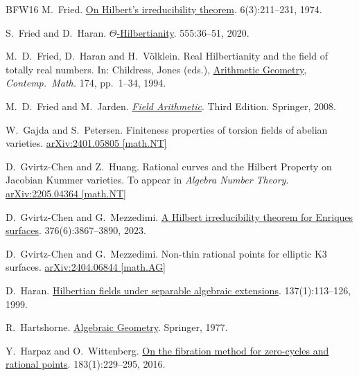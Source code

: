 \documentclass[10pt,a4paper]{amsart}
\theoremstyle{plain}
\theoremstyle{remark}
\numberwithin{theorem}{section}
\begin{document}
\begin{thebibliography}{BFW16}
M.~Fried.
\newblock \href{https://doi.org/10.1016/0022-314X(74)90015-8}{On Hilbert's irreducibility theorem}.
 6(3):211--231, 1974.

S.~Fried and D.~Haran.
\newblock \href{https://doi.org/10.1016/j.jalgebra.2020.03.007}{$\Theta$-Hilbertianity}.
 555:36--51, 2020.

M.~D.~Fried, D.~Haran and H.~Völklein. 
\newblock Real Hilbertianity and the field of totally real numbers.
\newblock In: Childress, Jones (eds.), \href{https://doi.org/10.1090/conm/174}{Arithmetic Geometry}, {{\em Contemp.\ Math.} 174}, pp.~1--34, 1994.

M.~D.~Fried and M.~Jarden.
\newblock \href{https://doi.org/10.1007/978-3-540-77270-5}{\em Field Arithmetic}.
\newblock Third Edition. Springer, 2008.

W.~Gajda and S.~Petersen.
\newblock Finiteness properties of torsion fields of abelian varieties.
\newblock \href{https://arxiv.org/abs/2401.05805}{arXiv:2401.05805 [math.NT]}

D.~Gvirtz-Chen and Z.~Huang.
\newblock Rational curves and the Hilbert Property on Jacobian Kummer varieties.
\newblock To appear in {\em Algebra Number Theory}.
\newblock \href{https://doi.org/10.48550/arXiv.2205.04364}{arXiv:2205.04364 [math.NT]}

D.~Gvirtz-Chen and G.~Mezzedimi. 
\newblock \href{https://doi.org/10.1090/tran/8831}{A Hilbert irreducibility theorem for Enriques surfaces}. 
 376(6):3867--3890, 2023.

D.~Gvirtz-Chen and G.~Mezzedimi. 
\newblock  Non-thin rational points for elliptic K3 surfaces.
\newblock  \href{https://arxiv.org/abs/2404.06844}{arXiv:2404.06844 [math.AG]}

D.~Haran.
\newblock \href{https://doi.org/10.1007/s002220050325}{Hilbertian fields under separable algebraic extensions}.
 137(1):113--126, 1999.

R.~Hartshorne.
\newblock \href{https://doi.org/10.1007/978-1-4757-3849-0}{Algebraic Geometry}.
\newblock Springer, 1977.

Y.~Harpaz and O.~Wittenberg. 
\newblock \href{https://doi.org/10.4007/annals.2016.183.1.5}{On the fibration method for zero-cycles and rational points}.
 183(1):229--295, 2016.


\end{thebibliography}
\end{document}
